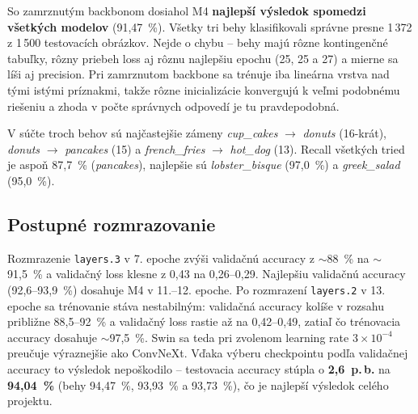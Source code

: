 So zamrznutým backbonom dosiahol M4 \textbf{najlepší výsledok spomedzi
všetkých modelov} (91,47~\%). Všetky tri behy klasifikovali správne
presne 1\,372 z 1\,500 testovacích obrázkov. Nejde o chybu -- behy majú
rôzne kontingenčné tabuľky, rôzny priebeh loss aj rôznu najlepšiu epochu
(25, 25 a 27) a mierne sa líši aj precision. Pri zamrznutom backbone sa
trénuje iba lineárna vrstva nad tými istými príznakmi, takže rôzne
inicializácie konvergujú k veľmi podobnému riešeniu a zhoda v počte
správnych odpovedí je tu pravdepodobná.


V súčte troch behov sú najčastejšie zámeny \emph{cup\_cakes}
$\rightarrow$ \emph{donuts} (16-krát), \emph{donuts} $\rightarrow$
\emph{pancakes} (15) a \emph{french\_fries} $\rightarrow$
\emph{hot\_dog} (13). Recall všetkých tried je aspoň 87,7~\%
(\emph{pancakes}), najlepšie sú \emph{lobster\_bisque} (97,0~\%)
a \emph{greek\_salad} (95,0~\%).

\subsection{Postupné rozmrazovanie}



Rozmrazenie \texttt{layers.3} v 7. epoche zvýši validačnú accuracy
z $\sim$88~\% na $\sim$91,5~\% a validačný loss klesne z 0,43 na
0,26--0,29. Najlepšiu validačnú accuracy (92,6--93,9~\%) dosahuje M4
v 11.--12. epoche. Po rozmrazení \texttt{layers.2} v 13. epoche sa
trénovanie stáva nestabilným: validačná accuracy kolíše v rozsahu
približne 88,5--92~\% a validačný loss rastie až na 0,42--0,49, zatiaľ
čo trénovacia accuracy dosahuje $\sim$97,5~\%. Swin sa teda pri
zvolenom learning rate $3\times10^{-4}$ preučuje výraznejšie ako ConvNeXt.
Vďaka výberu checkpointu podľa validačnej accuracy to výsledok
nepoškodilo -- testovacia accuracy stúpla o \textbf{2,6~p.\,b.} na
\textbf{94,04~\%} (behy 94,47~\%, 93,93~\% a 93,73~\%), čo je najlepší
výsledok celého projektu.

